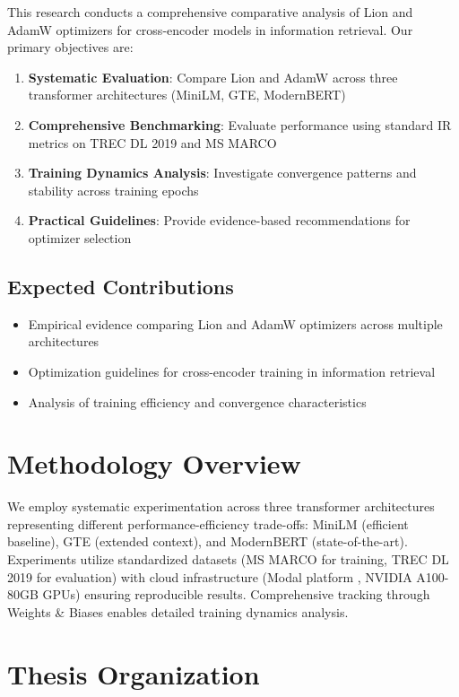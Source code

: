 This research conducts a comprehensive comparative analysis of Lion and AdamW optimizers for cross-encoder models in information retrieval. Our primary objectives are:

\begin{enumerate}
    \item \textbf{Systematic Evaluation}: Compare Lion and AdamW across three transformer architectures (MiniLM, GTE, ModernBERT)
    \item \textbf{Comprehensive Benchmarking}: Evaluate performance using standard IR metrics on TREC DL 2019 and MS MARCO
    \item \textbf{Training Dynamics Analysis}: Investigate convergence patterns and stability across training epochs
    \item \textbf{Practical Guidelines}: Provide evidence-based recommendations for optimizer selection
\end{enumerate}

\subsection{Expected Contributions}
\begin{itemize}
\item Empirical evidence comparing Lion and AdamW optimizers across multiple architectures
\item Optimization guidelines for cross-encoder training in information retrieval
\item Analysis of training efficiency and convergence characteristics
\end{itemize}

\section{Methodology Overview}

We employ systematic experimentation across three transformer architectures representing different performance-efficiency trade-offs: MiniLM (efficient baseline), GTE (extended context), and ModernBERT (state-of-the-art). Experiments utilize standardized datasets (MS MARCO \cite{DBLP:journals/corr/NguyenRSGTMD16} for training, TREC DL 2019 \cite{craswell2020overview} for evaluation) with cloud infrastructure (Modal platform \cite{modal_labs}, NVIDIA A100-80GB GPUs) ensuring reproducible results. Comprehensive tracking through Weights \& Biases \cite{wandb2020} enables detailed training dynamics analysis.

\section{Thesis Organization}

